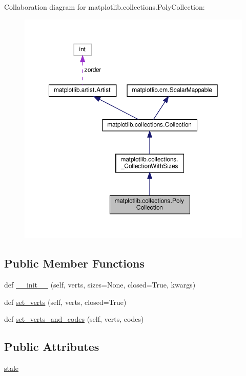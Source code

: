 Collaboration diagram for matplotlib.\+collections.\+Poly\+Collection\+:
\nopagebreak
\begin{figure}[H]
\begin{center}
\leavevmode
\includegraphics[width=350pt]{classmatplotlib_1_1collections_1_1PolyCollection__coll__graph}
\end{center}
\end{figure}
\subsection*{Public Member Functions}
\begin{DoxyCompactItemize}
\item 
def \hyperlink{classmatplotlib_1_1collections_1_1PolyCollection_a17e889c24a2423a4d5258c74d68dbd48}{\+\_\+\+\_\+init\+\_\+\+\_\+} (self, verts, sizes=None, closed=True, kwargs)
\item 
def \hyperlink{classmatplotlib_1_1collections_1_1PolyCollection_ada06fb0a14e12f529a52badcfd9f1d1b}{set\+\_\+verts} (self, verts, closed=True)
\item 
def \hyperlink{classmatplotlib_1_1collections_1_1PolyCollection_a8a245825bf8c8b709bc14f08d2bce8f5}{set\+\_\+verts\+\_\+and\+\_\+codes} (self, verts, codes)
\end{DoxyCompactItemize}
\subsection*{Public Attributes}
\begin{DoxyCompactItemize}
\item 
\hyperlink{classmatplotlib_1_1collections_1_1PolyCollection_a988c7061b07dc3f8f10547f576d37d15}{stale}
\end{DoxyCompactItemize}
